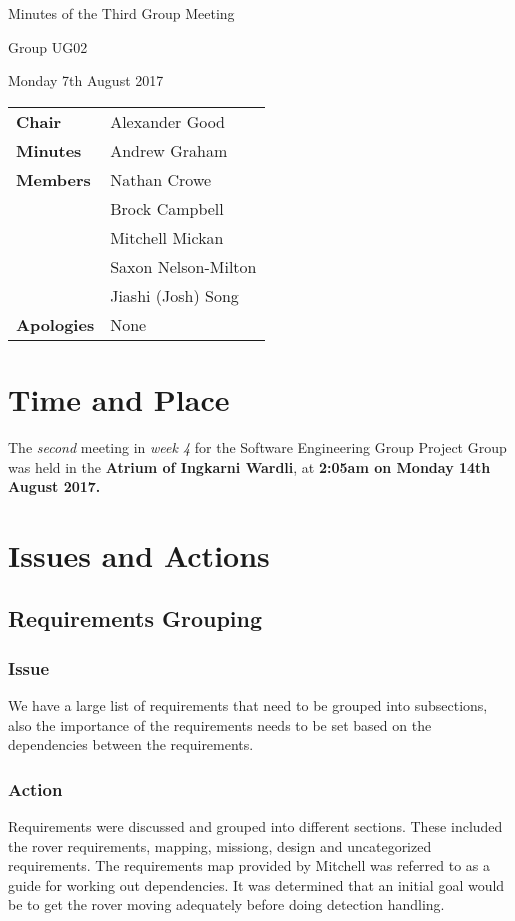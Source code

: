 \documentclass{article}
\begin{document}
\begin{center}    
{\huge Minutes of the Third Group Meeting \par}
\vspace{0.5cm}
{\large Group UG02 \par}
\vspace{0.5cm}
{\large Monday 7th August 2017 \par}
\vspace{0.5cm}
\end{center}

\begin{flushleft}
\begin{tabular}{ll}
{\bfseries Chair} & Alexander Good \\
{\bfseries Minutes} & Andrew Graham \\
{\bfseries Members} & Nathan Crowe \\
 & Brock Campbell \\
 & Mitchell Mickan \\
 & Saxon Nelson-Milton \\
 & Jiashi (Josh) Song \\
{\bfseries Apologies} & None\\
\end{tabular}
\end{flushleft}

\section{Time and Place}
The {\itshape second} meeting in {\itshape week 4} for the Software Engineering Group Project Group was held in the {\bfseries Atrium of Ingkarni Wardli}, at {\bfseries 2:05am on Monday 14th August 2017.} 

\section{Issues and Actions}
	\subsection{Requirements Grouping}
		\subsubsection*{Issue}
		We have a large list of requirements that need to be grouped into subsections, also the importance of the requirements needs to be set based on the dependencies between the requirements.
    	\subsubsection*{Action}
    	Requirements were discussed and grouped into different sections.  These included the rover requirements, mapping, missiong, design and uncategorized requirements. The requirements map provided by Mitchell was referred to as a guide for working out dependencies. It was determined that an initial goal would be to get the rover moving adequately before doing detection handling.
\end{document}
